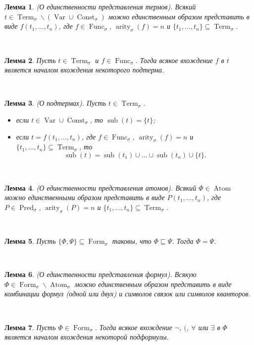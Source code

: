 \documentclass[a4paper,100pt]{article}
\theoremstyle{indented}
\newtheorem{lemma}{Лемма}
\theoremstyle{definition}
\theoremstyle{remark}
\DeclareMathOperator{\form}{Form}
\DeclareMathOperator{\Pred}{Pred}
\DeclareMathOperator{\Func}{Func}
\DeclareMathOperator{\Const}{Const}
\DeclareMathOperator{\arity}{arity}
\DeclareMathOperator{\Var}{Var}
\DeclareMathOperator{\Term}{Term}
\DeclareMathOperator{\sub}{sub}
\DeclareMathOperator{\Atom}{Atom}
\begin{document}
\begin{lemma}
  (О единственности представления термов). Всякий $t\in \Term_\sigma \backslash (\Var\cup\Const_\sigma)$ можно единственным образом представить в виде $f(t_1, \ldots, t_n)$, где $f\in \Func_\sigma$, $\arity_\sigma(f)=n$ и $\{t_1, \ldots, t_n\}\subseteq \Term_\sigma$. 
\end{lemma} \

\begin{lemma}
  Пусть $t\in \Term_\sigma$ и $f\in \Func_\sigma$. Тогда всякое вхождение $f$ в $t$ является началом вхождения некоторого подтерма.
\end{lemma} \

\begin{lemma}
  (О подтермах). Пусть $t\in\Term_\sigma$. 

  \begin{itemize}
    \item если $t\in \Var \cup \Const_\sigma$, то $\sub(t)=\{t\}$;
    \item если $t=f(t_1, \ldots, t_n)$, где $f\in \Func_\sigma$, $\arity_\sigma(f)=n$ и $\{t_1, \ldots, t_n\}\subseteq \Term_\sigma$, то 
    \[
      \sub(t)=\sub(t_1)\cup\ldots\cup \sub(t_n)\cup \{ t \}. 
    \]
  \end{itemize}
\end{lemma} \ 

\begin{lemma}
  (О единственности представления атомов). Всякий $\Phi \in \Atom$ можно единственными образом представить в виде $P(t_1, \ldots, t_n)$, где $P\in \Pred_\sigma$, $\arity_\sigma(P)=n$ и $\{t_1, \ldots, t_n\}\subseteq \Term_\sigma$. 
\end{lemma} \ 

\begin{lemma}
  Пусть $\{\Phi, \Psi\}\subseteq \form_\sigma$ таковы, что $\Phi \sqsubseteq \Psi$. Тогда $\Phi = \Psi$. 
\end{lemma} \ 

\begin{lemma}
  (О единственности представления формул). Всякую $\Phi\in \form_\sigma \backslash \Atom_\sigma$ можно единственным образом представить в виде комбинации формул (одной или двух) и символов связок или символов кванторов.
\end{lemma} \ 

\begin{lemma}
  Пусть $\Phi\in \form_\sigma$. Тогда всякое вхождение $\neg$, $($, $\forall$ или $\exists$ в $\Phi$ является началом вхождения некоторой подформулы.
\end{lemma} \ 
\end{document}
